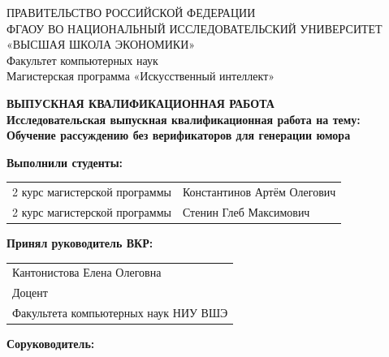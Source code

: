 \begin{titlepage}
\newpage

{
\begin{center}
ПРАВИТЕЛЬСТВО РОССИЙСКОЙ ФЕДЕРАЦИИ\\
ФГАОУ ВО НАЦИОНАЛЬНЫЙ ИССЛЕДОВАТЕЛЬСКИЙ УНИВЕРСИТЕТ\\
«ВЫСШАЯ ШКОЛА ЭКОНОМИКИ»
\\
\bigskip
Факультет компьютерных наук\\
Магистерская программа «Искусственный интеллект»
\end{center}
}

\vspace{7em}

\begin{center}
{\bf ВЫПУСКНАЯ КВАЛИФИКАЦИОННАЯ РАБОТА}\\
{\bf Исследовательская выпускная квалификационная работа на тему:}\\
{\bf Обучение рассуждению без верификаторов для генерации юмора}\\
\end{center}

\vspace{2em}

{\bf Выполнили студенты: \vspace{2mm}}

{
\begin{tabular}{l@{\hskip 1.5cm}l}
2 курс магистерской программы & Константинов Артём Олегович\\
2 курс магистерской программы & Стенин Глеб Максимович
\end{tabular}}

\vspace{3em}
{\bf Принял руководитель ВКР: \vspace{2mm}}

{
\begin{tabular}{l}
Кантонистова Елена Олеговна\\
Доцент\\
Факультета компьютерных наук НИУ ВШЭ 
\end{tabular}}

\vspace{2em}
{\bf Соруководитель: \vspace{2mm}}


\end{titlepage}
